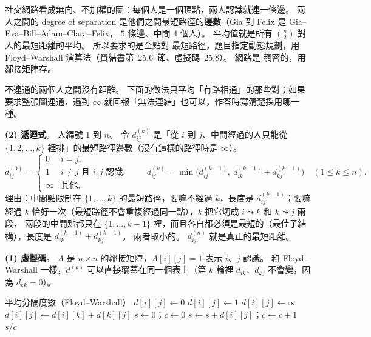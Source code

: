 \begin{pastsoln}
社交網路看成無向、不加權的圖：每個人是一個頂點，兩人認識就連一條邊。 兩人之間的 degree of
separation 是他們之間最短路徑的\textbf{邊數}（Gia 到 Felix 是 Gia--Eva--Bill--Adam--Clara--Felix，
$5$ 條邊、中間 $4$ 個人）。 平均值就是所有 $\binom{n}{2}$ 對人的最短距離的平均。 所以要求的是全點對
最短路徑，題目指定動態規劃，用 Floyd--Warshall 演算法（資結書第~25.6~節、虛擬碼~25.8）。 網路是
稠密的，用鄰接矩陣存。

不連通的兩個人之間沒有距離。 下面的做法只平均「有路相通」的那些對；如果要求整張圖連通，遇到
$\infty$ 就回報「無法連結」也可以，作答時寫清楚採用哪一種。

\textbf{(2) 遞迴式}。 人編號 $1$ 到 $n$。 令 $d^{(k)}_{ij}$ 是「從 $i$ 到 $j$、中間經過的人只能從
$\{1, 2, \ldots, k\}$ 裡挑」的最短路徑邊數（沒有這樣的路徑時是 $\infty$）。
\[
d^{(0)}_{ij} =
\begin{cases}
0 & i = j, \\
1 & i \ne j \text{ 且 } i, j \text{ 認識}, \\
\infty & \text{其他},
\end{cases}
\qquad
d^{(k)}_{ij} = \min\bigl(d^{(k-1)}_{ij},\ d^{(k-1)}_{ik} + d^{(k-1)}_{kj}\bigr) \quad (1 \le k \le n).
\]
理由：中間點限制在 $\{1, \ldots, k\}$ 的最短路徑，要嘛不經過 $k$，長度是 $d^{(k-1)}_{ij}$；要嘛
經過 $k$ 恰好一次（最短路徑不會重複經過同一點），$k$ 把它切成 $i \leadsto k$ 和 $k \leadsto j$ 兩段，
兩段的中間點都只在 $\{1, \ldots, k - 1\}$ 裡，而且各自都必須是最短的（最佳子結構），長度是
$d^{(k-1)}_{ik} + d^{(k-1)}_{kj}$。 兩者取小的。 $d^{(n)}_{ij}$ 就是真正的最短距離。

\textbf{(1) 虛擬碼}。 $A$ 是 $n \times n$ 的鄰接矩陣，$A[i][j] = 1$ 表示 $i$、$j$ 認識。 和 Floyd--Warshall
一樣，$d^{(k)}$ 可以直接覆蓋在同一個表上（第 $k$ 輪裡 $d_{ik}$、$d_{kj}$ 不會變，因為
$d_{kk} = 0$）。
\begin{pseudo}[unbreakable]{平均分隔度數（Floyd--Warshall）}
                \State $d[i][j] \gets 0$
                \State $d[i][j] \gets 1$
            \Else
                \State $d[i][j] \gets \infty$
            \EndIf
        \EndFor
    \EndFor
     
                    \State $d[i][j] \gets d[i][k] + d[k][j]$
                \EndIf
            \EndFor
        \EndFor
    \EndFor
    \State $s \gets 0$；$c \gets 0$
                \State $s \gets s + d[i][j]$；$c \gets c + 1$
            \EndIf
        \EndFor
    \EndFor
    \State \Return $s / c$ 
\EndFunction
\end{pseudo}


\end{pastsoln}
